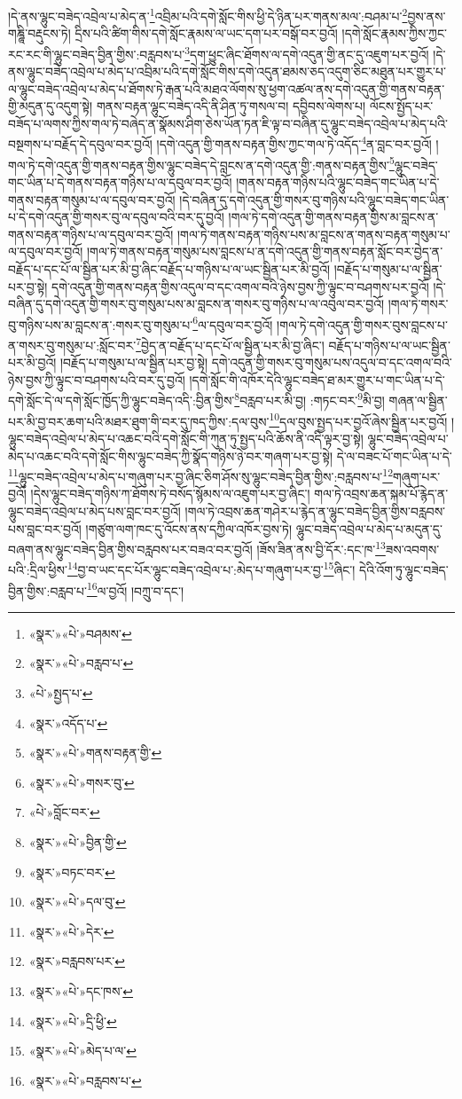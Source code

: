 །དེ་ནས་ལྷུང་བཟེད་འབྲེལ་པ་མེད་ན་\footnote{«སྣར་»«པེ་»བཤམས་}འབྲིམ་པའི་དགེ་སློང་གིས་ཕྱི་དེ་ཉིན་པར་གནས་མལ་:བཤམ་པ་\footnote{«སྣར་»«པེ་»བརླབ་པ་}བྱས་ནས་གཎྜཱི་བརྡུངས་ཏེ། དྲིས་པའི་ཚིག་གིས་དགེ་སློང་རྣམས་ལ་ཡང་དག་པར་བསྒོ་བར་བྱའོ། །དགེ་སློང་རྣམས་ཀྱིས་ཀྱང་རང་རང་གི་ལྷུང་བཟེད་བྱིན་གྱིས་:བརླབས་པ་\footnote{«པེ་»སྤྱད་པ་}དག་ཕྱུང་ཞིང་ཐོགས་ལ་དགེ་འདུན་གྱི་ནང་དུ་འཇུག་པར་བྱའོ། །དེ་ནས་ལྷུང་བཟེད་འབྲེལ་པ་མེད་པ་འབྲིམ་པའི་དགེ་སློང་གིས་དགེ་འདུན་ཐམས་ཅད་འདུག་ཅིང་མཐུན་པར་གྱུར་པ་ལ་ལྷུང་བཟེད་འབྲེལ་པ་མེད་པ་ཐོགས་ཏེ་རྒན་པའི་མཐའ་ལོགས་སུ་ཕྱག་འཚལ་ནས་དགེ་འདུན་གྱི་གནས་བརྟན་གྱི་མདུན་དུ་འདུག་སྟེ། གནས་བརྟན་ལྷུང་བཟེད་འདི་ནི་ཤིན་ཏུ་གསལ་བ། དབྱིབས་ལེགས་པ། ལོངས་སྤྱོད་པར་བཟོད་པ་ལགས་ཀྱིས་གལ་ཏེ་བཞེད་ན་སྣོམས་ཤིག་ཅེས་ཡོན་ཏན་ཇི་ལྟ་བ་བཞིན་དུ་ལྷུང་བཟེད་འབྲེལ་པ་མེད་པའི་བསྔགས་པ་བརྗོད་དེ་དབུལ་བར་བྱའོ། །དགེ་འདུན་གྱི་གནས་བརྟན་གྱིས་ཀྱང་གལ་ཏེ་འདོད་\footnote{«སྣར་»འདོད་པ་}ན་བླང་བར་བྱའོ། །གལ་ཏེ་དགེ་འདུན་གྱི་གནས་བརྟན་གྱིས་ལྷུང་བཟེད་དེ་བླངས་ན་དགེ་འདུན་གྱི་:གནས་བརྟན་གྱིས་\footnote{«སྣར་»«པེ་»གནས་བརྟན་གྱི་}ལྷུང་བཟེད་གང་ཡིན་པ་དེ་གནས་བརྟན་གཉིས་པ་ལ་དབུལ་བར་བྱའོ། །གནས་བརྟན་གཉིས་པའི་ལྷུང་བཟེད་གང་ཡིན་པ་དེ་གནས་བརྟན་གསུམ་པ་ལ་དབུལ་བར་བྱའོ། །དེ་བཞིན་དུ་དགེ་འདུན་གྱི་གསར་བུ་གཉིས་པའི་ལྷུང་བཟེད་གང་ཡིན་པ་དེ་དགེ་འདུན་གྱི་གསར་བུ་ལ་དབུལ་བའི་བར་དུ་བྱའོ། །གལ་ཏེ་དགེ་འདུན་གྱི་གནས་བརྟན་གྱིས་མ་བླངས་ན་གནས་བརྟན་གཉིས་པ་ལ་དབུལ་བར་བྱའོ། །གལ་ཏེ་གནས་བརྟན་གཉིས་པས་མ་བླངས་ན་གནས་བརྟན་གསུམ་པ་ལ་དབུལ་བར་བྱའོ། །གལ་ཏེ་གནས་བརྟན་གསུམ་པས་བླངས་པ་ན་དགེ་འདུན་གྱི་གནས་བརྟན་སློང་བར་བྱེད་ན་བརྗོད་པ་དང་པོ་ལ་སྦྱིན་པར་མི་བྱ་ཞིང་བརྗོད་པ་གཉིས་པ་ལ་ཡང་སྦྱིན་པར་མི་བྱའོ། །བརྗོད་པ་གསུམ་པ་ལ་སྦྱིན་པར་བྱ་སྟེ། དགེ་འདུན་གྱི་གནས་བརྟན་གྱིས་འདུལ་བ་དང་འགལ་བའི་ཉེས་བྱས་ཀྱི་ལྟུང་བ་བཤགས་པར་བྱའོ། །དེ་བཞིན་དུ་དགེ་འདུན་གྱི་གསར་བུ་གསུམ་པས་མ་བླངས་ན་གསར་བུ་གཉིས་པ་ལ་འབུལ་བར་བྱའོ། །གལ་ཏེ་གསར་བུ་གཉིས་པས་མ་བླངས་ན་:གསར་བུ་གསུམ་པ་\footnote{«སྣར་»«པེ་»གསར་བུ་}ལ་དབུལ་བར་བྱའོ། །གལ་ཏེ་དགེ་འདུན་གྱི་གསར་བུས་བླངས་པ་ན་གསར་བུ་གསུམ་པ་:སློང་བར་\footnote{«པེ་»བློང་བར་}བྱེད་ན་བརྗོད་པ་དང་པོ་ལ་སྦྱིན་པར་མི་བྱ་ཞིང་། བརྗོད་པ་གཉིས་པ་ལ་ཡང་སྦྱིན་པར་མི་བྱའོ། །བརྗོད་པ་གསུམ་པ་ལ་སྦྱིན་པར་བྱ་སྟེ། དགེ་འདུན་གྱི་གསར་བུ་གསུམ་པས་འདུལ་བ་དང་འགལ་བའི་ཉེས་བྱས་ཀྱི་ལྟུང་བ་བཤགས་པའི་བར་དུ་བྱའོ། །དགེ་སློང་གི་འཁོར་དེའི་ལྷུང་བཟེད་ཐ་མར་གྱུར་པ་གང་ཡིན་པ་དེ་དགེ་སློང་དེ་ལ་དགེ་སློང་ཁྱོད་ཀྱི་ལྷུང་བཟེད་འདི་:བྱིན་གྱིས་\footnote{«སྣར་»«པེ་»བྱིན་གྱི་}བརླབ་པར་མི་བྱ། :གཏང་བར་\footnote{«སྣར་»བཏང་བར་}མི་བྱ། གཞན་ལ་སྦྱིན་པར་མི་བྱ་བར་ཆག་པའི་མཐར་ཐུག་གི་བར་དུ་ཁད་ཀྱིས་:དལ་བུས་\footnote{«སྣར་»«པེ་»དལ་བུ་}དལ་བུས་སྤྱད་པར་བྱའོ་ཞེས་སྦྱིན་པར་བྱའོ། །ལྷུང་བཟེད་འབྲེལ་པ་མེད་པ་འཆང་བའི་དགེ་སློང་གི་ཀུན་ཏུ་སྤྱད་པའི་ཆོས་ནི་འདི་ལྟར་བྱ་སྟེ། ལྷུང་བཟེད་འབྲེལ་པ་མེད་པ་འཆང་བའི་དགེ་སློང་གིས་ལྷུང་བཟེད་ཀྱི་སྣོད་གཉིས་ཉེ་བར་གཞག་པར་བྱ་སྟེ། དེ་ལ་བཟང་པོ་གང་ཡིན་པ་དེ་\footnote{«སྣར་»«པེ་»དེར་}ལྷུང་བཟེད་འབྲེལ་པ་མེད་པ་གཞུག་པར་བྱ་ཞིང་ཅིག་ཤོས་སུ་ལྷུང་བཟེད་བྱིན་གྱིས་:བརླབས་པ་\footnote{«སྣར་»བརླབས་པར་}གཞུག་པར་བྱའོ། །དེས་ལྷུང་བཟེད་གཉིས་ཀ་ཐོགས་ཏེ་བསོད་སྙོམས་ལ་འཇུག་པར་བྱ་ཞིང་། གལ་ཏེ་འབྲས་ཆན་སྐམ་པོ་རྙེད་ན་ལྷུང་བཟེད་འབྲེལ་པ་མེད་པས་བླང་བར་བྱའོ། །གལ་ཏེ་འབྲས་ཆན་གཤེར་པ་རྙེད་ན་ལྷུང་བཟེད་བྱིན་གྱིས་བརླབས་པས་བླང་བར་བྱའོ། །གཙུག་ལག་ཁང་དུ་འོངས་ནས་དཀྱིལ་འཁོར་བྱས་ཏེ། ལྷུང་བཟེད་འབྲེལ་པ་མེད་པ་མདུན་དུ་བཞག་ནས་ལྷུང་བཟེད་བྱིན་གྱིས་བརླབས་པར་བཟའ་བར་བྱའོ། །ཟོས་ཟིན་ནས་བྱི་དོར་:དང་ཁ་\footnote{«སྣར་»«པེ་»དང་ཁས་}ཟས་འབགས་པའི་:དྲིལ་ཕྱིས་\footnote{«སྣར་»«པེ་»དྲི་ཕྱི་}བྱ་བ་ཡང་དང་པོར་ལྷུང་བཟེད་འབྲེལ་པ་:མེད་པ་གཞུག་པར་བྱ་\footnote{«སྣར་»«པེ་»མེད་པ་ལ་}ཞིང་། དེའི་འོག་ཏུ་ལྷུང་བཟེད་བྱིན་གྱིས་:བརླབ་པ་\footnote{«སྣར་»«པེ་»བརླབས་པ་}ལ་བྱའོ། །བཀྲུ་བ་དང་། 